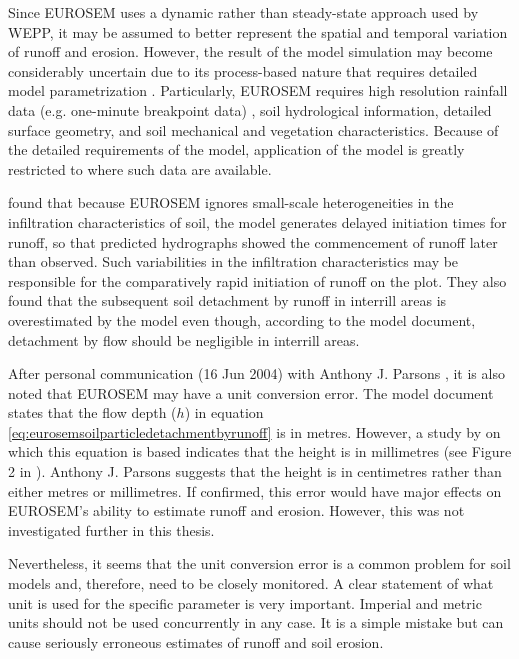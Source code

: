 Since EUROSEM uses a dynamic rather than steady-state approach used by WEPP, it
may be assumed to better represent the spatial and temporal variation of runoff
and erosion. However, the result of the model simulation may become considerably
uncertain due to its process-based nature that requires detailed model
parametrization \citep{quinton1998-65}. Particularly, EUROSEM requires high
resolution rainfall data (e.g. one-minute breakpoint data)
\citep{morgan1998-389}, soil hydrological information, detailed surface
geometry, and soil mechanical and vegetation characteristics. Because of the
detailed requirements of the model, application of the model is greatly
restricted to where such data are available.

\citet{parsons2000-181} found that because EUROSEM ignores small-scale
heterogeneities in the infiltration characteristics of soil, the model generates
delayed initiation times for runoff, so that predicted hydrographs showed the
commencement of runoff later than observed. Such variabilities in the
infiltration characteristics may be responsible for the
comparatively rapid initiation of runoff on the plot. They also found that the
subsequent soil detachment by runoff in interrill areas is overestimated by the
model even though, according to the model document, detachment by flow should be
negligible in interrill areas.

After personal communication (16 Jun 2004) with Anthony J. Parsons , it is
also noted that EUROSEM may have a unit conversion error. The model document
states that the flow depth ($h$) in equation
\ref{eq:eurosemsoilparticledetachmentbyrunoff} is in metres. However, a study by
\citet{torri1987-149} on which this equation is based indicates that the height
is in millimetres (see Figure 2 in \citet{torri1987-149}). Anthony J. Parsons
suggests that the height is in centimetres rather than either metres or
millimetres. If confirmed, this error would have major effects on EUROSEM's
ability to estimate runoff and erosion. However, this was not investigated
further in this thesis.

Nevertheless, it seems that the unit conversion error is a common problem for
soil models and, therefore, need to be closely monitored. A clear statement of
what unit is used for the specific parameter is very important. Imperial and
metric units should not be used concurrently in any case. It is a simple mistake
but can cause seriously erroneous estimates of runoff and soil erosion.


